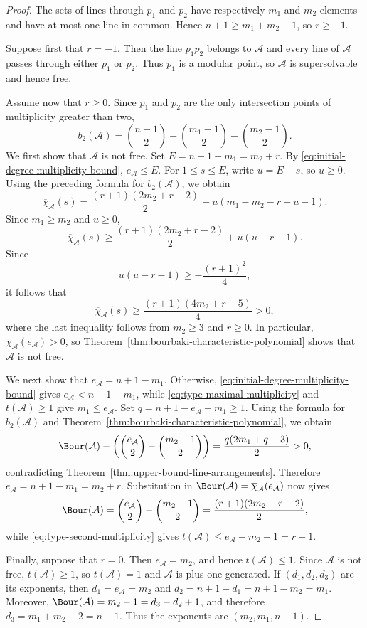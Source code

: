 \documentclass[11pt]{amsart}   %
\theoremstyle{definition}
\def\A{{\mathcal A}}
\begin{document}
\begin{proof}
The sets of lines through $p_1$ and $p_2$ have respectively $m_1$ and $m_2$ elements and have at most one line in common. Hence $n+1\geq m_1+m_2-1$, so $r\geq-1$.

Suppose first that $r=-1$. Then the line $p_1p_2$ belongs to $\A$ and every line of $\A$ passes through either $p_1$ or $p_2$. Thus $p_1$ is a modular point, so $\A$ is supersolvable and hence free.

Assume now that $r\geq0$. Since $p_1$ and $p_2$ are the only intersection points of multiplicity greater than two,
\[
b_2(\A)
=
\binom{n+1}{2}
-\binom{m_1-1}{2} -\binom{m_2-1}{2}.
\]
We first show that $\A$ is not free. Set $E=n+1-m_1=m_2+r$. By \eqref{eq:initial-degree-multiplicity-bound}, $e_\A\leq E$. For $1\leq s\leq E$, write $u=E-s$, so $u\geq0$. Using the preceding formula for $b_2(\A)$, we obtain
\[
\overline{\chi}_\A(s)
=
\frac{(r+1)(2m_2+r-2)}{2}
+ u(m_1-m_2-r+u-1).
\]
Since $m_1\geq m_2$ and $u\geq0$,
\[
\overline{\chi}_\A(s)
\geq
\frac{(r+1)(2m_2+r-2)}{2}
+ u(u-r-1).
\]
Since
\[
u(u-r-1)\geq-\frac{(r+1)^2}{4},
\]
it follows that
\[
\overline{\chi}_\A(s)
\geq
\frac{(r+1)(4m_2+r-5)}{4}>0,
\]
where the last inequality follows from $m_2\geq3$ and $r\geq0$. In particular, $\overline{\chi}_\A(e_\A)>0$, so Theorem~\ref{thm:bourbaki-characteristic-polynomial} shows that $\A$ is not free.

We next show that $e_\A=n+1-m_1$. Otherwise, \eqref{eq:initial-degree-multiplicity-bound} gives $e_\A<n+1-m_1$, while \eqref{eq:type-maximal-multiplicity} and $t(\A)\geq1$ give $m_1\leq e_\A$. Set $q=n+1-e_\A-m_1\geq1$. Using the formula for $b_2(\A)$ and Theorem~\ref{thm:bourbaki-characteristic-polynomial}, we obtain
\[
\Bour(\A)
-
\left(
\binom{e_\A}{2}-\binom{m_2-1}{2}
\right)
=
\frac{q(2m_1+q-3)}{2}>0,
\]
contradicting Theorem~\ref{thm:upper-bound-line-arrangements}. Therefore $e_\A=n+1-m_1=m_2+r.$ Substitution in $\Bour(\A)=\overline{\chi}_\A(e_\A)$ now gives
\[
\Bour(\A)
=
\binom{e_\A}{2}-\binom{m_2-1}{2}
=
\frac{(r+1)(2m_2+r-2)}{2},
\]
while \eqref{eq:type-second-multiplicity} gives $t(\A)\leq e_\A-m_2+1=r+1$.

Finally, suppose that $r=0$. Then $e_\A=m_2$, and hence $t(\A)\leq1$. Since $\A$ is not free, $t(\A)\geq1$, so $t(\A)=1$ and $\A$ is plus-one generated. If $(d_1,d_2,d_3)$ are its exponents, then $d_1=e_\A=m_2$ and $d_2=n+1-d_1=n+1-m_2=m_1.$ Moreover, $\Bour(\A)=m_2-1=d_3-d_2+1$, and therefore $d_3=m_1+m_2-2=n-1.$ Thus the exponents are $(m_2,m_1,n-1)$.
\end{proof}
\end{document}
